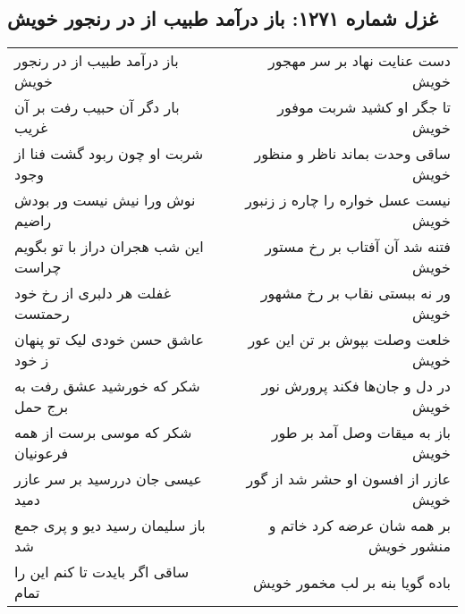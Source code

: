 \begin{center}
\section*{غزل شماره ۱۲۷۱: باز درآمد طبیب از در رنجور خویش}
\label{sec:1271}
\begin{longtable}{l p{0.5cm} r}
باز درآمد طبیب از در رنجور خویش
&&
دست عنایت نهاد بر سر مهجور خویش
\\
بار دگر آن حبیب رفت بر آن غریب
&&
تا جگر او کشید شربت موفور خویش
\\
شربت او چون ربود گشت فنا از وجود
&&
ساقی وحدت بماند ناظر و منظور خویش
\\
نوش ورا نیش نیست ور بودش راضیم
&&
نیست عسل خواره را چاره ز زنبور خویش
\\
این شب هجران دراز با تو بگویم چراست
&&
فتنه شد آن آفتاب بر رخ مستور خویش
\\
غفلت هر دلبری از رخ خود رحمتست
&&
ور نه ببستی نقاب بر رخ مشهور خویش
\\
عاشق حسن خودی لیک تو پنهان ز خود
&&
خلعت وصلت بپوش بر تن این عور خویش
\\
شکر که خورشید عشق رفت به برج حمل
&&
در دل و جان‌ها فکند پرورش نور خویش
\\
شکر که موسی برست از همه فرعونیان
&&
باز به میقات وصل آمد بر طور خویش
\\
عیسی جان دررسید بر سر عازر دمید
&&
عازر از افسون او حشر شد از گور خویش
\\
باز سلیمان رسید دیو و پری جمع شد
&&
بر همه شان عرضه کرد خاتم و منشور خویش
\\
ساقی اگر بایدت تا کنم این را تمام
&&
باده گویا بنه بر لب مخمور خویش
\\
\end{longtable}
\end{center}

